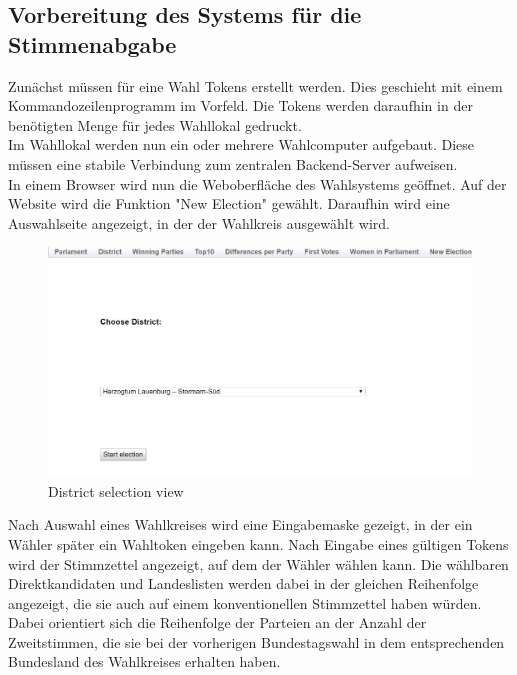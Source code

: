 \documentclass[a4paper]{scrreprt}
\begin{document}
\subsection{Vorbereitung des Systems für die Stimmenabgabe}

Zunächst müssen für eine Wahl Tokens erstellt werden.
Dies geschieht mit einem Kommandozeilenprogramm im Vorfeld.
Die Tokens werden daraufhin in der benötigten Menge für jedes Wahllokal gedruckt. \\

Im Wahllokal werden nun ein oder mehrere Wahlcomputer aufgebaut.
Diese müssen eine stabile Verbindung zum zentralen Backend-Server aufweisen. \\

In einem Browser wird nun die Weboberfläche des Wahlsystems geöffnet.
Auf der Website wird die Funktion "New Election" gewählt.
Daraufhin wird eine Auswahlseite angezeigt, in der der Wahlkreis ausgewählt wird.\\

\begin{figure}[H]
\centering
\includegraphics[width=\textwidth]{images/select_district.png}
\caption {District selection view}
\end{figure}

Nach Auswahl eines Wahlkreises wird eine Eingabemaske gezeigt, in der ein Wähler später ein Wahltoken eingeben kann. Nach Eingabe eines gültigen Tokens wird der Stimmzettel angezeigt, auf dem der Wähler wählen kann. Die wählbaren Direktkandidaten und Landeslisten werden dabei in der gleichen Reihenfolge angezeigt, die sie auch auf einem konventionellen Stimmzettel haben würden. Dabei orientiert sich die Reihenfolge der Parteien an der Anzahl der Zweitstimmen, die sie bei der vorherigen Bundestagswahl in dem entsprechenden Bundesland des Wahlkreises erhalten haben. \\
\end{document}
